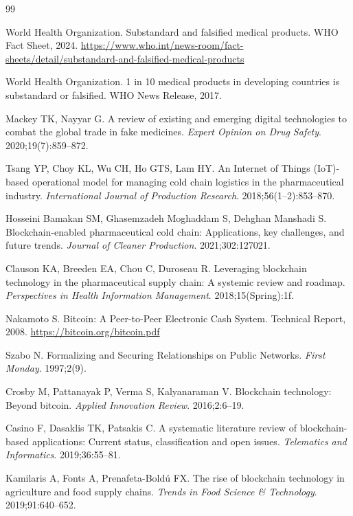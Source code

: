 \documentclass[pdflatex,sn-mathphys-num]{sn-jnl}
\theoremstyle{thmstyleone}
\theoremstyle{thmstyletwo}
\theoremstyle{thmstylethree}
\begin{document}
\begin{thebibliography}{99}

World Health Organization. Substandard and falsified medical products. WHO Fact Sheet, 2024. \url{https://www.who.int/news-room/fact-sheets/detail/substandard-and-falsified-medical-products}

World Health Organization. 1 in 10 medical products in developing countries is substandard or falsified. WHO News Release, 2017.

Mackey TK, Nayyar G. A review of existing and emerging digital technologies to combat the global trade in fake medicines. \textit{Expert Opinion on Drug Safety}. 2020;19(7):859--872.

Tsang YP, Choy KL, Wu CH, Ho GTS, Lam HY. An Internet of Things (IoT)-based operational model for managing cold chain logistics in the pharmaceutical industry. \textit{International Journal of Production Research}. 2018;56(1--2):853--870.

Hosseini Bamakan SM, Ghasemzadeh Moghaddam S, Dehghan Manshadi S. Blockchain-enabled pharmaceutical cold chain: Applications, key challenges, and future trends. \textit{Journal of Cleaner Production}. 2021;302:127021.

Clauson KA, Breeden EA, Chou C, Duroseau R. Leveraging blockchain technology in the pharmaceutical supply chain: A systemic review and roadmap. \textit{Perspectives in Health Information Management}. 2018;15(Spring):1f.

Nakamoto S. Bitcoin: A Peer-to-Peer Electronic Cash System. Technical Report, 2008. \url{https://bitcoin.org/bitcoin.pdf}

Szabo N. Formalizing and Securing Relationships on Public Networks. \textit{First Monday}. 1997;2(9).

Crosby M, Pattanayak P, Verma S, Kalyanaraman V. Blockchain technology: Beyond bitcoin. \textit{Applied Innovation Review}. 2016;2:6--19.

Casino F, Dasaklis TK, Patsakis C. A systematic literature review of blockchain-based applications: Current status, classification and open issues. \textit{Telematics and Informatics}. 2019;36:55--81.

Kamilaris A, Fonts A, Prenafeta-Bold{\'u} FX. The rise of blockchain technology in agriculture and food supply chains. \textit{Trends in Food Science \& Technology}. 2019;91:640--652.


\end{thebibliography}
\end{document}
